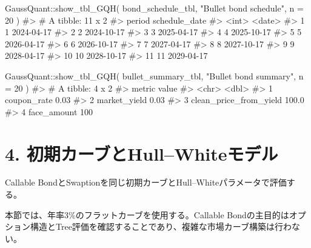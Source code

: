 \documentclass[
  letterpaper,
  DIV=11,
  numbers=noendperiod]{scrreprt}
\newenvironment{Shaded}{\begin{snugshade}}{\end{snugshade}}
\newcommand{\AttributeTok}[1]{\textcolor[rgb]{0.40,0.45,0.13}{#1}}
\newcommand{\CommentTok}[1]{\textcolor[rgb]{0.37,0.37,0.37}{#1}}
\newcommand{\DecValTok}[1]{\textcolor[rgb]{0.68,0.00,0.00}{#1}}
\newcommand{\FunctionTok}[1]{\textcolor[rgb]{0.28,0.35,0.67}{#1}}
\newcommand{\NormalTok}[1]{\textcolor[rgb]{0.00,0.23,0.31}{#1}}
\newcommand{\SpecialCharTok}[1]{\textcolor[rgb]{0.37,0.37,0.37}{#1}}
\newcommand{\StringTok}[1]{\textcolor[rgb]{0.13,0.47,0.30}{#1}}
\begin{document}
\begin{Shaded}
\begin{Highlighting}[]
\NormalTok{GaussQuant}\SpecialCharTok{::}\FunctionTok{show\_tbl\_GQH}\NormalTok{(}
\NormalTok{  bond\_schedule\_tbl,}
  \StringTok{"Bullet bond schedule"}\NormalTok{,}
  \AttributeTok{n =} \DecValTok{20}
\NormalTok{)}
\CommentTok{\#\textgreater{} \# A tibble: 11 x 2}
\CommentTok{\#\textgreater{}    period schedule\_date}
\CommentTok{\#\textgreater{}     \textless{}int\textgreater{} \textless{}date\textgreater{}       }
\CommentTok{\#\textgreater{}  1      1 2024{-}04{-}17   }
\CommentTok{\#\textgreater{}  2      2 2024{-}10{-}17   }
\CommentTok{\#\textgreater{}  3      3 2025{-}04{-}17   }
\CommentTok{\#\textgreater{}  4      4 2025{-}10{-}17   }
\CommentTok{\#\textgreater{}  5      5 2026{-}04{-}17   }
\CommentTok{\#\textgreater{}  6      6 2026{-}10{-}17   }
\CommentTok{\#\textgreater{}  7      7 2027{-}04{-}17   }
\CommentTok{\#\textgreater{}  8      8 2027{-}10{-}17   }
\CommentTok{\#\textgreater{}  9      9 2028{-}04{-}17   }
\CommentTok{\#\textgreater{} 10     10 2028{-}10{-}17   }
\CommentTok{\#\textgreater{} 11     11 2029{-}04{-}17}

\NormalTok{GaussQuant}\SpecialCharTok{::}\FunctionTok{show\_tbl\_GQH}\NormalTok{(}
\NormalTok{  bullet\_summary\_tbl,}
  \StringTok{"Bullet bond summary"}\NormalTok{,}
  \AttributeTok{n =} \DecValTok{20}
\NormalTok{)}
\CommentTok{\#\textgreater{} \# A tibble: 4 x 2}
\CommentTok{\#\textgreater{}   metric                  value}
\CommentTok{\#\textgreater{}   \textless{}chr\textgreater{}                   \textless{}dbl\textgreater{}}
\CommentTok{\#\textgreater{} 1 coupon\_rate              0.03}
\CommentTok{\#\textgreater{} 2 market\_yield             0.03}
\CommentTok{\#\textgreater{} 3 clean\_price\_from\_yield 100.0 }
\CommentTok{\#\textgreater{} 4 face\_amount            100}
\end{Highlighting}
\end{Shaded}

\section{4.
初期カーブとHull--Whiteモデル}\label{ux521dux671fux30abux30fcux30d6ux3068hullwhiteux30e2ux30c7ux30eb}

Callable
BondとSwaptionを同じ初期カーブとHull--Whiteパラメータで評価する。

本節では、年率3\%のフラットカーブを使用する。Callable
Bondの主目的はオプション構造とTree評価を確認することであり、複雑な市場カーブ構築は行わない。
\end{document}
